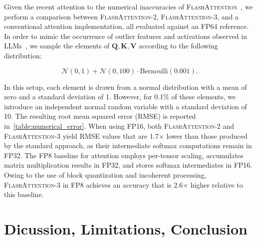 \begin{algorithm}[H]
\begin{algorithmic}[1]
\begin{enumerate}
\begin{itemize}
Given the recent attention to the numerical inaccuracies of \textsc{FlashAttention}~\citep{golden2024flash}, we perform a comparison between \textsc{FlashAttention-2}, \textsc{FlashAttention-3}, and a conventional attention implementation, all evaluated against an FP64 reference. In order to mimic the occurrence of outlier features and activations observed in LLMs~\citep{dettmers2208llm, sun2024massive}, we sample the elements of $\mathbf{Q}, \mathbf{K}, \mathbf{V}$ according to the following distribution:

\begin{equation*}
  \mathcal{N}(0, 1) + \mathcal{N}(0, 100) \cdot \mathrm{Bernoulli}(0.001).
\end{equation*}

In this setup, each element is drawn from a normal distribution with a mean of zero and a standard deviation of 1. However, for 0.1\% of these elements, we introduce an independent normal random variable with a standard deviation of 10. The resulting root mean squared error (RMSE) is reported in~\cref{table:numerical_error}. When using FP16, both \textsc{FlashAttention-2} and \textsc{FlashAttention-3} yield RMSE values that are 1.7$\times$ lower than those produced by the standard approach, as their intermediate softmax computations remain in FP32. The FP8 baseline for attention employs per-tensor scaling, accumulates matrix multiplication results in FP32, and stores softmax intermediates in FP16. Owing to the use of block quantization and incoherent processing, \textsc{FlashAttention-3} in FP8 achieves an accuracy that is 2.6$\times$ higher relative to this baseline.

\section{Dicussion, Limitations, Conclusion}
\label{sec:discussion}


\end{itemize}
\end{enumerate}
\end{algorithmic}
\end{algorithm}
